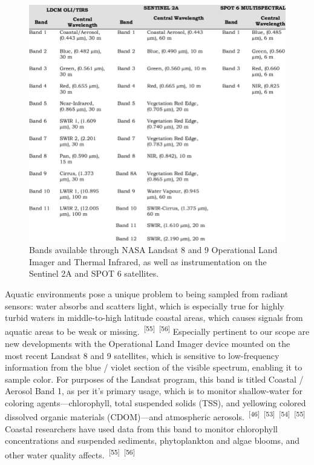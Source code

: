 \documentclass{article}
\begin{document}

\begin{figure}
    \centering
    \includegraphics[width=0.7\linewidth]{images/landsat-8-specs.png}
    \caption{Bands available through NASA Landsat 8 and 9 Operational Land Imager and Thermal Infrared, as well as instrumentation on the Sentinel 2A and SPOT 6 satellites.}
    \label{figure13}
\end{figure}


\par{Aquatic environments pose a unique problem to being sampled from radiant sensors: water absorbs and scatters light, which is especially true for highly turbid waters in middle-to-high latitude coastal areas, which causes signals from aquatic areas to be weak or missing.~\textsuperscript{[55]}~\textsuperscript{[56]} Especially pertinent to our scope are new developments with the Operational Land Imager device mounted on the most recent Landsat 8 and 9 satellites, which is sensitive to low-frequency information from the blue / violet section of the visible spectrum, enabling it to sample color. For purposes of the Landsat program, this band is titled Coastal / Aerosol Band 1, as per it's primary usage, which is to monitor shallow-water for coloring agents---chlorophyll, total suspended solids (TSS), and yellowing colored dissolved organic materials (CDOM)---and atmospheric aerosols.~\textsuperscript{[46]}~\textsuperscript{[53]}~\textsuperscript{[54]}~\textsuperscript{[55]} Coastal researchers have used data from this band to monitor chlorophyll concentrations and suspended sediments, phytoplankton and algae blooms, and other water quality affects.~\textsuperscript{[55]}~\textsuperscript{[56]}}
\end{document}

